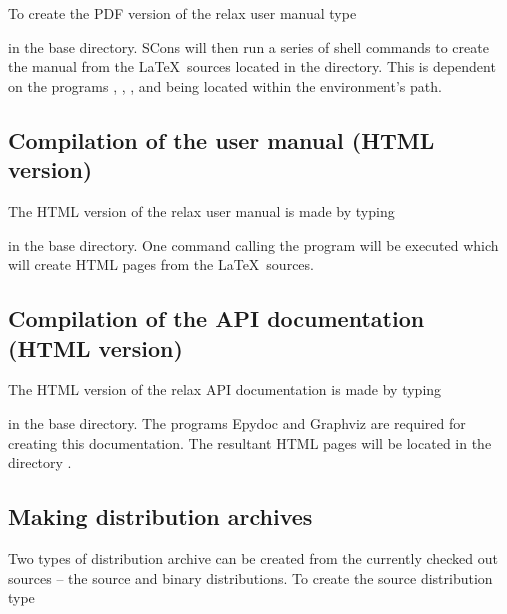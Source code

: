 To create the PDF version of the relax user manual type


in the base directory.  SCons will then run a series of shell commands to create the manual from the \LaTeX\ sources located in the  directory.  This is dependent on the programs , , , and  being located within the environment's path.



\subsection{Compilation of the user manual (HTML version)}

The HTML version of the relax user manual is made by typing


in the base directory.  One command calling the program  will be executed which will create HTML pages from the \LaTeX\ sources.



\subsection{Compilation of the API documentation (HTML version)}

The HTML version of the relax API documentation is made by typing


in the base directory.  The programs Epydoc and Graphviz are required for creating this documentation.  The resultant HTML pages will be located in the directory .



\subsection{Making distribution archives}

Two types of distribution archive can be created from the currently checked out sources -- the source and binary distributions.  To create the source distribution type 

